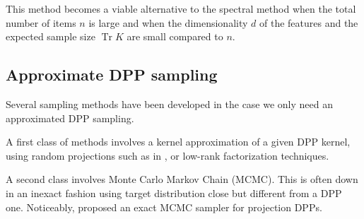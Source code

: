 This method becomes a viable alternative to the spectral method when the total
number of items $n$ is large and when the dimensionality $d$ of the
features and the expected sample size $\operatorname{Tr} K$ are small compared to $n$.





\subsection{Approximate DPP sampling}
Several sampling methods have been developed in the case we only need an approximated DPP sampling.

A first class of methods involves a kernel approximation of a given DPP kernel, using random projections such as in \cite{kulesza2012_dpp_for_ml}, or low-rank factorization techniques.

A second class involves Monte Carlo Markov Chain (MCMC). This is often down in an inexact fashion using target distribution close but different from a DPP one. Noticeably, \cite{gautier2017_zonotope_for_dpp_sampling} proposed an exact MCMC sampler for projection DPPs.

\vspace{10cm}

